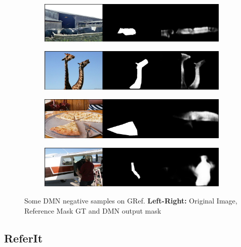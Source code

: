 \begin{figure}[!htbp]
    \centering
    \begin{subfigure}[b]{\columnwidth}
            \centering
            \includegraphics[width=\textwidth]{./figures/gref_samples/1_neg.png}
    \end{subfigure}
    
    \begin{subfigure}[b]{\columnwidth}
            \centering
            \includegraphics[width=\textwidth]{./figures/gref_samples/2_neg.png}
    \end{subfigure}
    
    \begin{subfigure}[b]{\columnwidth}
            \centering
            \includegraphics[width=\textwidth]{./figures/gref_samples/3_neg.png}
    \end{subfigure}
    
    \begin{subfigure}[b]{\columnwidth}
            \centering
            \includegraphics[width=\textwidth]{./figures/gref_samples/4_neg.png}
    \end{subfigure}
    \caption{Some DMN negative samples on GRef. \textbf{Left-Right:} Original Image, Reference Mask GT and DMN output mask}
    \label{Fig:GRef_Neg}
\end{figure}
\FloatBarrier

\subsection*{ReferIt}
